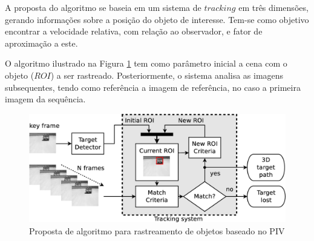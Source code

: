 A proposta do algoritmo se baseia em um sistema de $tracking$ em três dimensões, gerando informações
sobre a posição do objeto de interesse. Tem-se como objetivo encontrar a velocidade relativa, 
com relação ao observador,  e fator de aproximação a este.

O algoritmo ilustrado na Figura \ref{fig:system} tem como parâmetro inicial a cena com o
objeto ($ROI$) a ser rastreado. Posteriormente, o sistema analisa as imagens subsequentes, 
tendo como referência a imagem de referência, no caso a primeira imagem da sequência.

\begin{figure}[h]
\includegraphics[width=\columnwidth]{images/figure1-diagram1.eps}
\caption{Proposta de algoritmo para rastreamento de objetos baseado no PIV}
\label{fig:system}
\end{figure}

